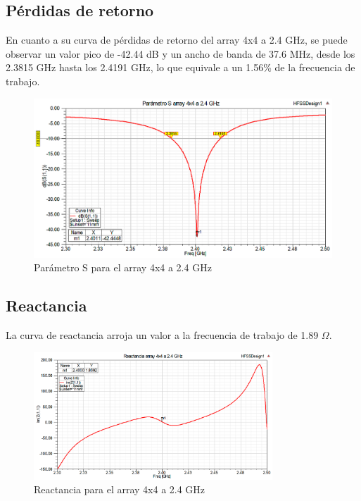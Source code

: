 \subsection{Pérdidas de retorno}
\par En cuanto a su curva de pérdidas de retorno del array 4x4 a 2.4 GHz, se puede observar un valor pico de -42.44 dB y un ancho de banda de 37.6 MHz, desde los 2.3815 GHz hasta los 2.4191 GHz, lo que equivale a un 1.56\% de la frecuencia de trabajo.
\\
\begin{figure}[H]
    \centering
        \includegraphics[width=\textwidth]{archivos/analisis/4x41/1}
        \caption{Parámetro S para el array 4x4 a 2.4 GHz}
        \label{fig:s4x41}
\end{figure}

\newpage
\subsection{Reactancia}
\par La curva de reactancia arroja un valor a la frecuencia de trabajo de 1.89 $\Omega$. 
\\
\begin{figure}[H]
    \centering
        \includegraphics[width=0.8\textwidth]{archivos/analisis/4x41/2}
        \caption{Reactancia para el array 4x4 a 2.4 GHz}
        \label{fig:react4x41}
\end{figure}

